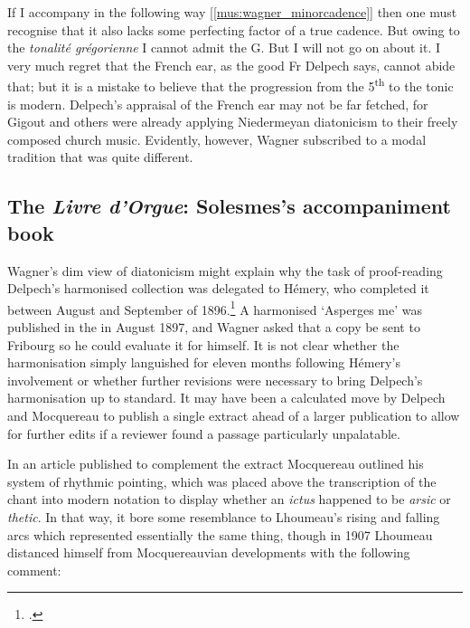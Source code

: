   {}
{If I accompany in the following way [\cref{mus:wagner_minorcadence}] then one must recognise that it also lacks some perfecting factor of a true cadence. But owing to the \emph{tonalité grégorienne} I cannot admit the G\kern 1pt{\normalfont \sharp{}}. But I will not go on about it. I very much regret that the French ear, as the good Fr Delpech says, cannot abide that; but it is a mistake to believe that the progression from the 5\textsuperscript{th} to the tonic is modern.}
\noindent
Delpech's appraisal of the French ear may not be far fetched, for Gigout and others were already applying Niedermeyan diatonicism to their freely composed church music.
\mbox{Evidently}, however, Wagner subscribed to a modal tradition that was quite different.

\subsection{The \emph{Livre d'Orgue}: Solesmes's accompaniment book}
Wagner's dim view of diatonicism might explain why the task of proof-reading Delpech's harmonised collection was delegated to Hémery, who completed it between August and September of 1896.\footcite[234]{HemeryEtienneHemerySa1898}
A harmonised `Asperges me' was published in the \tsg{} in August 1897, and Wagner asked that a copy be sent to Fribourg so he could evaluate it for himself.
It is not clear whether the harmonisation simply languished for eleven months following Hémery's involvement or whether further revisions were necessary to bring Delpech's harmonisation up to standard.
It may have been a calculated move by Delpech and Mocquereau to publish a single extract ahead of a larger publication to allow for further edits if a reviewer found a passage particularly unpalatable.

In an article published to complement the extract Mocquereau outlined his system of rhythmic pointing, which was placed above the transcription of the chant into modern notation to display whether an \emph{ictus} happened to be \emph{arsic} or \emph{thetic}.
In that way, it bore some resemblance to Lhoumeau's rising and falling arcs which represented essentially the same thing, though in 1907 Lhoumeau distanced himself from Mocquereauvian developments with the following comment:

